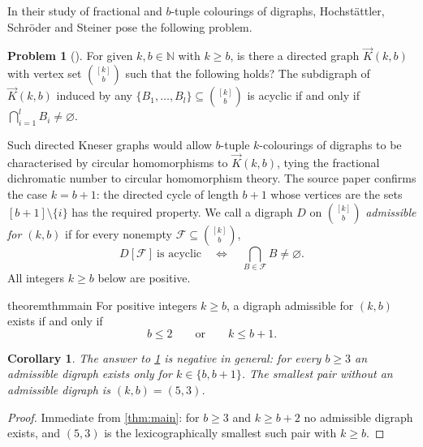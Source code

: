 \documentclass[11pt,a4paper]{article}
\theoremstyle{plain}
\newtheorem{corollary}[theorem]{Corollary}
\theoremstyle{definition}
\newtheorem{problem}[theorem]{Problem}
\theoremstyle{remark}
\newcommand{\dK}{\vec{K}}
\newcommand{\cF}{\mathcal F}
\newcommand{\N}{\mathbb N}
\newcommand{\kb}{\binom{[k]}{b}}
\begin{document}
In their study of fractional and $b$-tuple colourings of digraphs, Hochstättler, Schröder and Steiner pose the following problem.

\begin{problem}[{\cite[Problem~5.40]{HSS20}}]\label{prob:540}
For given $k,b\in\N$ with $k\ge b$, is there a directed graph $\dK(k,b)$ with vertex set $\kb$ such that the following holds? The subdigraph of $\dK(k,b)$ induced by any $\{B_1,\dots,B_l\}\subseteq\kb$ is acyclic if and only if $\bigcap_{i=1}^{l}B_i\ne\varnothing$.
\end{problem}

Such directed Kneser graphs would allow $b$-tuple $k$-colourings of digraphs to be characterised by circular homomorphisms to $\dK(k,b)$, tying the fractional dichromatic number to circular homomorphism theory. The source paper confirms the case $k=b+1$: the directed cycle of length $b+1$ whose vertices are the sets $[b+1]\setminus\{i\}$ has the required property. We call a digraph $D$ on $\kb$ \emph{admissible for $(k,b)$} if for every nonempty $\cF\subseteq\kb$,
\begin{equation}\label{eq:property}
 D[\cF]\ \text{is acyclic}\quad\Longleftrightarrow\quad\bigcap_{B\in\cF}B\ne\varnothing.
\end{equation}
All integers $k\ge b$ below are positive.

\begin{restatable}{theorem}{thmmain}\label{thm:main}
For positive integers $k\ge b$, a digraph admissible for $(k,b)$ exists if and only if
\[
 b\le2\qquad\text{or}\qquad k\le b+1 .
\]
\end{restatable}

\begin{corollary}\label{cor:answer}
The answer to \cref{prob:540} is negative in general: for every $b\ge3$ an admissible digraph exists only for $k\in\{b,b+1\}$. The smallest pair without an admissible digraph is $(k,b)=(5,3)$.
\end{corollary}
\begin{proof}
Immediate from \cref{thm:main}: for $b\ge3$ and $k\ge b+2$ no admissible digraph exists, and $(5,3)$ is the lexicographically smallest such pair with $k\ge b$.
\end{proof}
\end{document}
